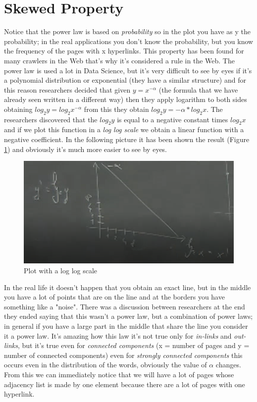 \section{Skewed Property}
Notice that the power law is based on \textit{probability} so in the plot you have as y the probability; in the real applications you don't know the probability, but you know the frequency of the pages with x hyperlinks.\newline
This property has been found for many crawlers in the Web that's why it's considered a rule in the Web. The power law is used a lot in Data Science, but it's very difficult to  see by eyes if it's a polynomial distribution or exponential (they have a similar structure) and for this reason researchers decided that given $y=x^{-\alpha}$ (the formula that we have already seen written in a different way) then they apply logarithm to both sides obtaining $log_{2}y = log_{2}x^{-\alpha}$ from this they obtain $log_{2}y = -\alpha * log_{2}x$. The researchers discovered that the $log_{2}y$ is equal to a negative constant times $log_{2}x$ and if we plot this function in a \textit{log log scale} we obtain a linear function with a negative coefficient. In the following picture it has been shown the result (Figure \ref{fig:loglog}) and obviously it's much more easier to see by eyes.
\begin{figure}
    \centering
    \includegraphics[width=0.75\linewidth]{images/loglog.png}
    \caption{Plot with a log log scale}
    \label{fig:loglog}
\end{figure}
In the real life it doesn't happen that you obtain an exact line, but in the middle you have a lot of points that are on the line and at the borders you have something like a "noise". There was a discussion between researchers at the end they ended saying that this wasn't a power law, but a combination of power laws; in general if you have a large part in the middle that share the line you consider it a power law.
It's amazing how this law it's not true only for \textit{in-links} and \textit{out-links}, but it's true even for \textit{connected components} (x = number of pages and y = number of connected components) even for \textit{strongly connected components} this occurs even in the distribution of the words, obviously the value of $\alpha$ changes.\newline
From this we can immediately notice that we will have a lot of pages whose adjacency list is made by one element because there are a lot of pages with one hyperlink.\newline
